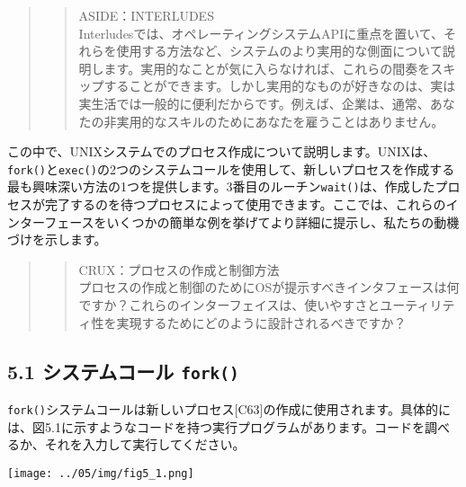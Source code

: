 \begin{quote}
\begin{quote}
ASIDE：INTERLUDES\\
Interludesでは、オペレーティングシステムAPIに重点を置いて、それらを使用する方法など、システムのより実用的な側面について説明します。実用的なことが気に入らなければ、これらの間奏をスキップすることができます。しかし実用的なものが好きなのは、実は実生活では一般的に便利だからです。例えば、企業は、通常、あなたの非実用的なスキルのためにあなたを雇うことはありません。
\end{quote}
\end{quote}

この中で、UNIXシステムでのプロセス作成について説明します。UNIXは、\texttt{fork()}と\texttt{exec()}の2つのシステムコールを使用して、新しいプロセスを作成する最も興味深い方法の1つを提供します。3番目のルーチン\texttt{wait()}は、作成したプロセスが完了するのを待つプロセスによって使用できます。ここでは、これらのインターフェースをいくつかの簡単な例を挙げてより詳細に提示し、私たちの動機づけを示します。

\begin{quote}
\begin{quote}
CRUX：プロセスの作成と制御方法\\
プロセスの作成と制御のためにOSが提示すべきインタフェースは何ですか？これらのインターフェイスは、使いやすさとユーティリティ性を実現するためにどのように設計されるべきですか？
\end{quote}
\end{quote}

\hypertarget{ux30b7ux30b9ux30c6ux30e0ux30b3ux30fcux30eb-fork}{%
\subsection*{\texorpdfstring{5.1 システムコール
\texttt{fork()}}{5.1 システムコール fork()}}\label{ux30b7ux30b9ux30c6ux30e0ux30b3ux30fcux30eb-fork}}

\texttt{fork()}システムコールは新しいプロセス{[}C63{]}の作成に使用されます。具体的には、図5.1に示すようなコードを持つ実行プログラムがあります。コードを調べるか、それを入力して実行してください。

\texttt{[image: ../05/img/fig5\_1.png]}

